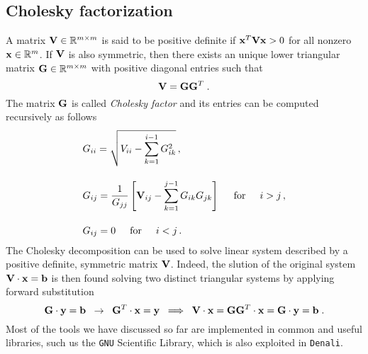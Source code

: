 \subsection{Cholesky factorization}
A matrix $\mathbf{V}\in \mathbb{R}^{m \times m}$ is said to be positive definite if $\mathbf{x}^T \mathbf{V} \mathbf{x} > 0$ for all nonzero $\mathbf{x} \in \mathbb{R}^{m}$. If $\mathbf{V}$ is also symmetric, then there exists an unique lower triangular matrix $\mathbf{G} \in \mathbb{R}^{m \times m}$ with positive diagonal entries such that
\begin{equation*}
    \mathbf{V} = \mathbf{G} \mathbf{G}^T \;.
\end{equation*}
The matrix $\mathbf{G}$ is called \textit{Cholesky factor} and its entries can be computed recursively as follows
\begin{align}
    &G_{ii} = \sqrt{V_{ii} - \sum_{k=1}^{i-1} G_{ik}^2}\,,\\[10pt]
    & G_{ij} = \frac{1}{G_{jj}} \left[ \mathbf{V}_{ij} - \sum_{k=1}^{j-1} G_{ik} G_{jk}\right] \hspace{5mm} \textrm{for} \hspace{5mm} i>j \,,\\[10pt]
    &G_{ij} = 0 \hspace{5mm} \textrm{for} \hspace{5mm} i<j \, .
\end{align}
The Cholesky decomposition can be used to solve linear system described by a positive definite, symmetric matrix $\mathbf{V}$. Indeed, the slution of the original system $\mathbf{V} \cdot \mathbf{x} = \mathbf{b}$ is then found solving two distinct triangular systems by applying forward substitution
\begin{equation*}
    \mathbf{G}\cdot \mathbf{y} = \mathbf{b} \; \; \rightarrow \; \;  \mathbf{G}^{T}\cdot \mathbf{x} = \mathbf{y} \; \; \Longrightarrow \; \; \mathbf{V} \cdot\mathbf{x} = \mathbf{G} \mathbf{G}^T \cdot \mathbf{x} = \mathbf{G} \cdot \mathbf{y} = \mathbf{b}\; .
\end{equation*}
Most of the tools we have discussed so far are implemented in common and useful libraries, such us the \texttt{GNU} Scientific Library, which is also exploited in \texttt{Denali}.